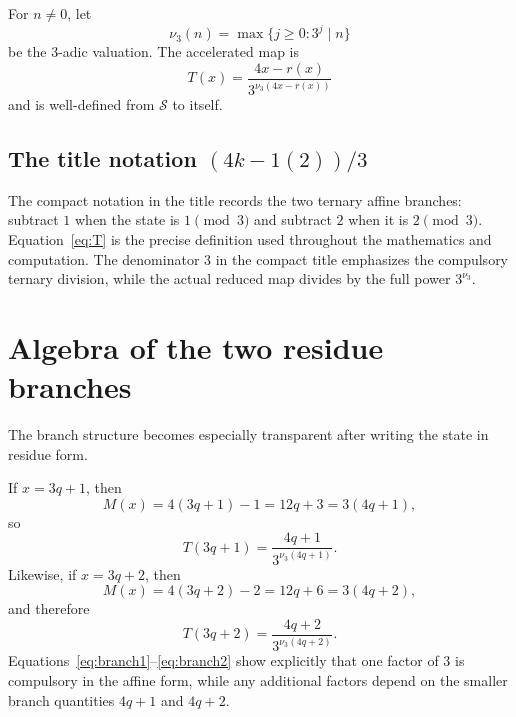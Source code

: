 \documentclass[11pt]{article}
\newcommand{\vthree}{\nu_3}
\newcommand{\Sset}{\mathcal S}
\newcommand{\Tmap}{T}
\newcommand{\Mmap}{M}
\begin{document}
For $n\ne0$, let
\[
\vthree(n)=\max\{j\ge0:3^j\mid n\}
\]
be the $3$-adic valuation.  The accelerated map is
\begin{equation}
\boxed{
\Tmap(x)=\frac{4x-r(x)}{3^{\vthree(4x-r(x))}}
}
\label{eq:T}
\end{equation}
and is well-defined from $\Sset$ to itself.

\subsection{The title notation $(4k-1(2))/3$}
The compact notation in the title records the two ternary affine branches: subtract $1$ when the state is $1\pmod3$ and subtract $2$ when it is $2\pmod3$.  Equation~\eqref{eq:T} is the precise definition used throughout the mathematics and computation.  The denominator $3$ in the compact title emphasizes the compulsory ternary division, while the actual reduced map divides by the full power $3^{\vthree}$.

\section{Algebra of the two residue branches}
The branch structure becomes especially transparent after writing the state in residue form.

If $x=3q+1$, then
\begin{equation}
\Mmap(x)=4(3q+1)-1=12q+3=3(4q+1),
\end{equation}
so
\begin{equation}
\Tmap(3q+1)=\frac{4q+1}{3^{\vthree(4q+1)}}.
\label{eq:branch1}
\end{equation}
Likewise, if $x=3q+2$, then
\begin{equation}
\Mmap(x)=4(3q+2)-2=12q+6=3(4q+2),
\end{equation}
and therefore
\begin{equation}
\Tmap(3q+2)=\frac{4q+2}{3^{\vthree(4q+2)}}.
\label{eq:branch2}
\end{equation}
Equations~\eqref{eq:branch1}--\eqref{eq:branch2} show explicitly that one factor of $3$ is compulsory in the affine form, while any additional factors depend on the smaller branch quantities $4q+1$ and $4q+2$.
\end{document}
